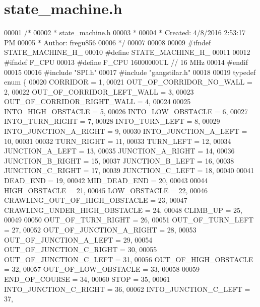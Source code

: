 \hypertarget{state__machine_8h_source}{}\section{state\+\_\+machine.\+h}
\label{state__machine_8h_source}

\begin{DoxyCode}
00001 \textcolor{comment}{/*}
00002 \textcolor{comment}{ * state\_machine.h}
00003 \textcolor{comment}{ *}
00004 \textcolor{comment}{ * Created: 4/8/2016 2:53:17 PM}
00005 \textcolor{comment}{ *  Author: fregu856}
00006 \textcolor{comment}{ */} 
00007 
00008 
00009 \textcolor{preprocessor}{#ifndef STATE\_MACHINE\_H\_}
00010 \textcolor{preprocessor}{#define STATE\_MACHINE\_H\_}
00011 
00012 \textcolor{preprocessor}{#ifndef F\_CPU}
00013 \textcolor{preprocessor}{#define F\_CPU 16000000UL        // 16 MHz}
00014 \textcolor{preprocessor}{#endif}
00015 
00016 \textcolor{preprocessor}{#include "SPI.h"}
00017 \textcolor{preprocessor}{#include "gangstilar.h"}
00018 
00019 \textcolor{keyword}{typedef} \textcolor{keyword}{enum} \{
00020     CORRIDOR = 1, 
00021     OUT\_OF\_CORRIDOR\_NO\_WALL = 2, 
00022     OUT\_OF\_CORRIDOR\_LEFT\_WALL = 3, 
00023     OUT\_OF\_CORRIDOR\_RIGHT\_WALL = 4,
00024     
00025     INTO\_HIGH\_OBSTACLE = 5, 
00026     INTO\_LOW\_OBSTACLE = 6, 
00027     INTO\_TURN\_RIGHT = 7, 
00028     INTO\_TURN\_LEFT = 8, 
00029     INTO\_JUNCTION\_A\_RIGHT = 9, 
00030     INTO\_JUNCTION\_A\_LEFT = 10,
00031     
00032     TURN\_RIGHT = 11, 
00033     TURN\_LEFT = 12, 
00034     JUNCTION\_A\_LEFT = 13, 
00035     JUNCTION\_A\_RIGHT = 14, 
00036     JUNCTION\_B\_RIGHT = 15, 
00037     JUNCTION\_B\_LEFT = 16, 
00038     JUNCTION\_C\_RIGHT = 17, 
00039     JUNCTION\_C\_LEFT = 18, 
00040     
00041     DEAD\_END = 19,
00042     MID\_DEAD\_END = 20,
00043     
00044     HIGH\_OBSTACLE = 21, 
00045     LOW\_OBSTACLE = 22, 
00046     CRAWLING\_OUT\_OF\_HIGH\_OBSTACLE = 23, 
00047     CRAWLING\_UNDER\_HIGH\_OBSTACLE = 24, 
00048     CLIMB\_UP = 25,
00049     
00050     OUT\_OF\_TURN\_RIGHT = 26, 
00051     OUT\_OF\_TURN\_LEFT = 27, 
00052     OUT\_OF\_JUNCTION\_A\_RIGHT = 28, 
00053     OUT\_OF\_JUNCTION\_A\_LEFT = 29, 
00054     OUT\_OF\_JUNCTION\_C\_RIGHT = 30, 
00055     OUT\_OF\_JUNCTION\_C\_LEFT = 31, 
00056     OUT\_OF\_HIGH\_OBSTACLE = 32, 
00057     OUT\_OF\_LOW\_OBSTACLE = 33,
00058     
00059     END\_OF\_COURSE = 34, 
00060     STOP = 35,
00061     INTO\_JUNCTION\_C\_RIGHT = 36,
00062     INTO\_JUNCTION\_C\_LEFT = 37,

\end{DoxyCode}
